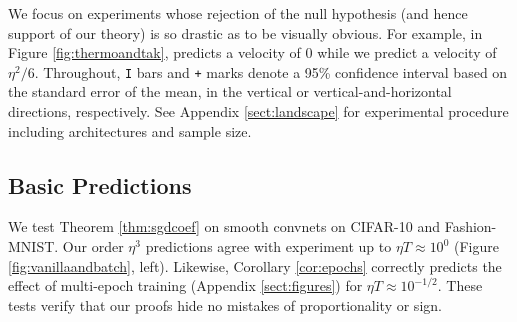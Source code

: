 \documentclass{article}
\theoremstyle{plain}
\theoremstyle{definition}
\begin{document}
    We focus on experiments whose rejection of the null hypothesis (and hence
    support of our theory) is so drastic as to be visually obvious.  For
    example, in Figure \ref{fig:thermoandtak}, \citep{ch18} predicts a velocity
    of $0$ while we predict a velocity of $\eta^2/6$.  
    Throughout, \texttt{I} bars and \texttt{+} marks denote a 95\% confidence
    interval based on the standard error of the mean, in the vertical or
    vertical-and-horizontal directions, respectively.  See Appendix
    \ref{sect:landscape} for experimental procedure including architectures and
    sample size.


    \subsection{Basic Predictions}
        We test Theorem \ref{thm:sgdcoef} on smooth convnets on CIFAR-10 and
        Fashion-MNIST.  Our order $\eta^3$ predictions agree with experiment up
        to $\eta T \approx 10^0$ (Figure \ref{fig:vanillaandbatch}, left).
        Likewise, Corollary \ref{cor:epochs} correctly predicts the effect of
        multi-epoch training (Appendix \ref{sect:figures}) for $\eta T \approx
        10^{-1/2}$.  These tests verify that our proofs hide no mistakes of
        proportionality or sign.  

\end{document}
